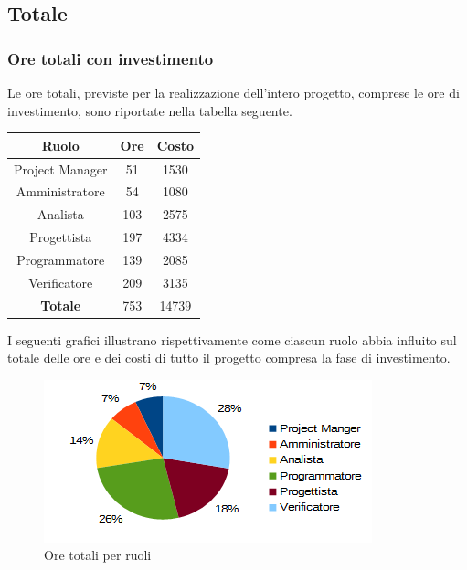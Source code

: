 	\subsection{Totale}
		\subsubsection{Ore totali con investimento}
		Le ore totali, previste per la realizzazione dell'intero progetto, comprese le ore di investimento, sono riportate nella tabella seguente. \\
		\begin{table}[H]
		\centering
		\begin{tabular}{|c|c|c|}
			\hline
			\textbf{Ruolo}		& \textbf{Ore}	& \textbf{Costo} \\
			\hline
			Project Manager		& 51			& 1530	\\
			Amministratore		& 54			& 1080	\\
			Analista			& 103			& 2575	\\
			Progettista			& 197			& 4334	\\
			Programmatore		& 139			& 2085	\\
			Verificatore		& 209			& 3135	\\
			\hline
			\textbf{Totale}		& 753			& 14739	\\
			\hline
		\end{tabular}
		\end{table}
		I seguenti grafici illustrano rispettivamente come ciascun ruolo abbia influito sul totale delle ore e dei costi di tutto il progetto compresa la fase di investimento. \\
		\begin{figure}[H]
		\centering
			\includegraphics[width=1\linewidth]{immagini/grafici/riepilogo_conclusivo-torta.png}
			\caption{Ore totali per ruoli}
		\end{figure}
